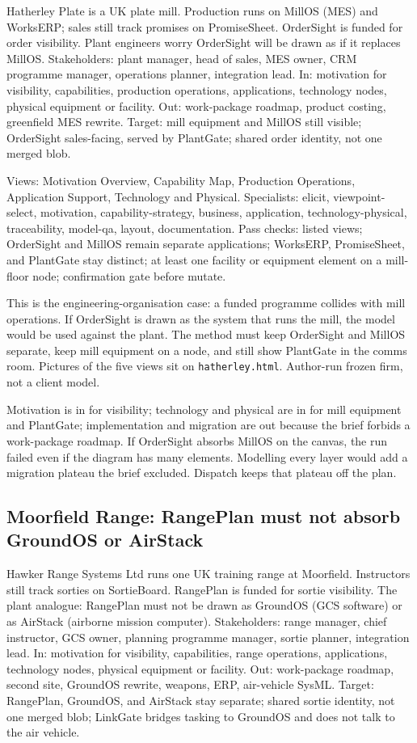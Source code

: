 \documentclass[10pt,journal,compsoc]{IEEEtran}
\begin{document}
Hatherley Plate is a UK plate mill. Production runs on MillOS (MES) and WorksERP; sales still track promises on PromiseSheet. OrderSight is funded for order visibility. Plant engineers worry OrderSight will be drawn as if it replaces MillOS. Stakeholders: plant manager, head of sales, MES owner, CRM programme manager, operations planner, integration lead. In: motivation for visibility, capabilities, production operations, applications, technology nodes, physical equipment or facility. Out: work-package roadmap, product costing, greenfield MES rewrite. Target: mill equipment and MillOS still visible; OrderSight sales-facing, served by PlantGate; shared order identity, not one merged blob.

Views: Motivation Overview, Capability Map, Production Operations, Application Support, Technology and Physical. Specialists: elicit, viewpoint-select, motivation, capability-strategy, business, application, technology-physical, traceability, model-qa, layout, documentation. Pass checks: listed views; OrderSight and MillOS remain separate applications; WorksERP, PromiseSheet, and PlantGate stay distinct; at least one facility or equipment element on a mill-floor node; confirmation gate before mutate.

This is the engineering-organisation case: a funded programme collides with mill operations. If OrderSight is drawn as the system that runs the mill, the model would be used against the plant. The method must keep OrderSight and MillOS separate, keep mill equipment on a node, and still show PlantGate in the comms room. Pictures of the five views sit on \texttt{hatherley.html}. Author-run frozen firm, not a client model.

Motivation is in for visibility; technology and physical are in for mill equipment and PlantGate; implementation and migration are out because the brief forbids a work-package roadmap. If OrderSight absorbs MillOS on the canvas, the run failed even if the diagram has many elements. Modelling every layer would add a migration plateau the brief excluded. Dispatch keeps that plateau off the plan.

\subsection{Moorfield Range: RangePlan must not absorb GroundOS or AirStack}

Hawker Range Systems Ltd runs one UK training range at Moorfield. Instructors still track sorties on SortieBoard. RangePlan is funded for sortie visibility. The plant analogue: RangePlan must not be drawn as GroundOS (GCS software) or as AirStack (airborne mission computer). Stakeholders: range manager, chief instructor, GCS owner, planning programme manager, sortie planner, integration lead. In: motivation for visibility, capabilities, range operations, applications, technology nodes, physical equipment or facility. Out: work-package roadmap, second site, GroundOS rewrite, weapons, ERP, air-vehicle SysML. Target: RangePlan, GroundOS, and AirStack stay separate; shared sortie identity, not one merged blob; LinkGate bridges tasking to GroundOS and does not talk to the air vehicle.
\end{document}
